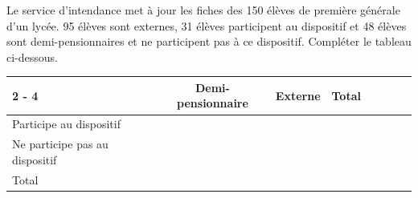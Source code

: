 \documentclass[11pt,a4paper]{article}  %
\begin{document}

Le service d'intendance met à jour les fiches des 150 élèves de première générale d'un lycée. 95 élèves sont externes, 31 élèves participent au dispositif  et 48 élèves sont demi-pensionnaires et ne participent pas à ce dispositif. Compléter le tableau ci-dessous.\\
\begin{tabular}{|Xc|Xc|Xc|Xc|}
	\cline { 2 - 4 } \multicolumn{1}{c|}{} & Demi-pensionnaire & Externe & Total \\
	\hline Participe au dispositif &   &   &   \\
	\hline Ne participe pas au dispositif &   &   &   \\
	\hline Total &   &   &   \\
	\hline
\end{tabular}
\end{document}
